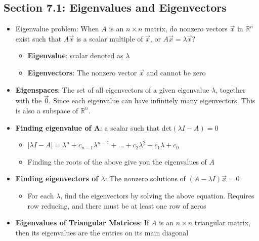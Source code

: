 \documentclass[15pt]{article}
\begin{document}
\begin{flushleft}
\section{\textbf{Section 7.1}: Eigenvalues and Eigenvectors}
\begin{itemize}
        \item Eigenvalue problem: When $A$ is an $n \times n$ matrix, do nonzero
                vectors $\vec{x}$ in $\mathbb{R}^n$ exist such that $A\vec{x}$
                is a scalar multiple of $\vec{x}$, or $A\vec{x} = \lambda
                \vec{x}$?
                \begin{itemize}
                        \item \textbf{Eigenvalue}: scalar denoted as $\lambda$
                        \item \textbf{Eigenvectors}: The nonzero vector 
                                $\vec{x}$ and cannot be zero
                \end{itemize}
        \item \textbf{Eigenspaces}: The set of all eigenvectors of a given 
                eigenvalue $\lambda$, together with the $\vec{0}$. Since each 
                eigenvalue can have infinitely many eigenvectors. This is also a
                subspace of $\mathbb{R}^n$.
        \item \textbf{Finding eigenvalue of A}: a scalar such that det$(\lambda 
                I - A) = 0$
                \begin{itemize}
                        \item $|\lambda I - A| = \lambda^n + c_{n-1}
                                \lambda^{n-1} + \dots + c_2 \lambda^2 + c_1 
                                \lambda + c_0$
                        \item Finding the roots of the above give you the 
                                eigenvalues of $A$
                \end{itemize}
        \item \textbf{Finding eigenvectors of $\lambda$}: The nonzero solutions
                of $(A - \lambda I)\vec{x} = 0$
                \begin{itemize}
                        \item For each $\lambda$, find the eigenvectors by
                                solving the above equation. Requires row 
                                reducing, and there must be at least one row of
                                zeros
                \end{itemize}
        \item \textbf{Eigenvalues of Triangular Matrices}: If $A$ is an $n 
                \times n$ triangular matrix, then its eigenvalues are the 
                entries on its main diagonal
\end{itemize}


\end{flushleft}
\end{document}
